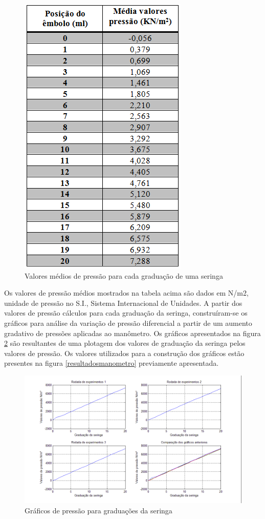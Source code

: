 \begin{figure}[H]
		\centering
			\includegraphics[scale=1.0]{figuras/pressaomedia.png}
		\caption{Valores médios de pressão para cada graduação de uma seringa}
		\label{pressaomedia}
\end{figure}

Os valores de pressão médios mostrados na tabela acima são dados em N/m2, unidade de pressão no S.I., Sistema Internacional de Unidades. A partir dos valores de pressão cálculos para cada graduação da seringa, construíram-se os gráficos para análise da variação de pressão diferencial a partir de um aumento gradativo de pressões aplicadas ao manômetro. Os gráficos apresentados na figura \ref{pressaoseringa} são resultantes de uma plotagem dos valores de graduação da seringa pelos valores de pressão. Os valores utilizados para a construção dos gráficos estão presentes na figura \ref{resultadosmanometro} previamente apresentada.

\begin{figure}[H]
		\centering
			\includegraphics[scale=1.0, angle=90]{figuras/pressaoseringa.png}
		\caption{Gráficos de pressão para graduações da seringa}
		\label{pressaoseringa}
\end{figure}

